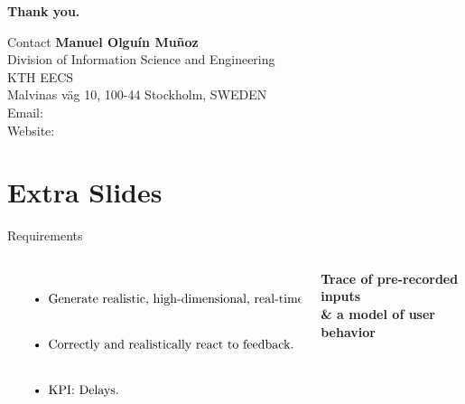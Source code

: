 \documentclass[aspectratio=1610]{beamer}
\begin{document}
\startpage
\begin{frame}{}
    \begin{center}
        \textbf{\Large Thank you.}\\
        \vspace{.1\textheight}%
        \begin{block}{\footnotesize Contact}
            \tiny%
            \textbf{Manuel Olguín Muñoz}\\
            Division of Information Science and Engineering\\
            KTH EECS\\
            Malvinas väg 10, 100-44 Stockholm, SWEDEN\\
            \vspace{.01\textheight}
            Email: \\
            Website: \\
        \end{block}
    \end{center}
    \vspace{.1\textheight}%
\end{frame}

\normalpage
\section{Extra Slides}
\begin{frame}{Requirements}
    \begin{columns}[onlytextwidth]
        \begin{column}{.5\linewidth}
            $\left.
                \begin{tabular}{p{.8\linewidth}}
                    \begin{itemize}
                        \itemsep2em
                        \item Generate realistic, high-dimensional, real-time inputs.
                        \item Correctly and realistically react to feedback.
                        \item KPI: Delays.
                    \end{itemize}
                \end{tabular}%
                \right\}$
        \end{column}%
        \begin{column}{.5\linewidth}
            \centering%
            \Large\bfseries%
            Trace of pre-recorded inputs\\
            \& a model of user behavior\\
        \end{column}
    \end{columns}
\end{frame}
\end{document}
